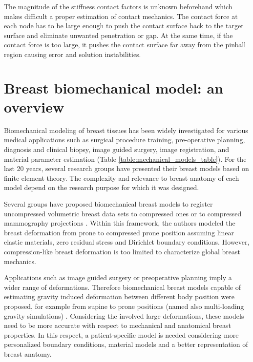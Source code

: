  The magnitude of the stiffness contact factors is unknown beforehand which makes difficult a proper estimation of contact mechanics. The contact force at each node has to be large enough to push the contact surface back to the target surface and eliminate unwanted penetration or gap. At the same time, if the contact force is too large, it pushes the contact surface far away from the pinball region causing error and solution instabilities.

\section{Breast biomechanical model: an overview}

Biomechanical modeling of breast tissues has been widely investigated for various medical applications such as surgical procedure training, pre-operative planning, diagnosis and clinical biopsy, image guided surgery, image registration, and material parameter estimation (Table \ref{table:mechanical_models_table}). For the last 20 years, several research groups have presented their breast models based on finite element theory.  The complexity and relevance to breast anatomy of each model depend on the research purpose for which it was designed. 

Several groups have proposed biomechanical breast models to register uncompressed volumetric breast data sets to compressed ones \citep{han_development_2012,ruiter_model_based_2006,sturgeon_finite_element_2016} or to compressed  mammography projections \citep{kellner_simulation_2007}. Within this framework, the authors modeled the breast deformation from prone to compressed prone position assuming linear elastic materials, zero residual stress and Dirichlet boundary conditions.
However, compression-like breast deformation is too limited to characterize global breast mechanics.

 Applications such as image guided surgery or preoperative planning imply a wider range of deformations. Therefore biomechanical breast models capable of estimating gravity induced deformation between different body position were proposed, for example from supine to prone positions (named also multi-loading gravity simulations) \citep{gamage_modelling_2012,georgii_simulation_2016,eiben_surface_2016}. Considering the involved large deformations, these models need to be more accurate with respect to mechanical and anatomical breast properties. In this respect, a patient-specific model is needed considering more personalized boundary conditions, material models and a better representation of breast anatomy. 

